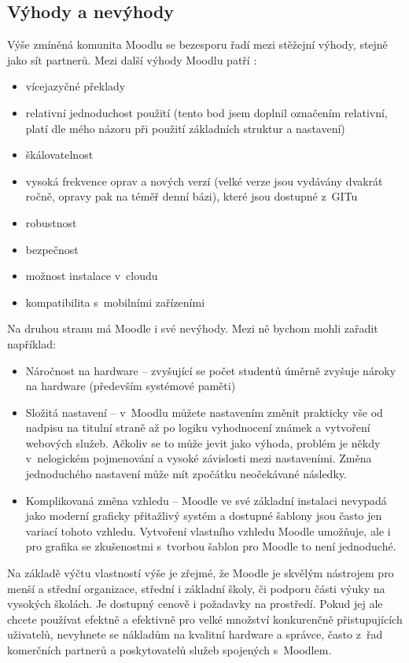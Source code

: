 \documentclass[
print,
  11pt,
  table,   
  nolof,    
  nolot,
  oneside,final
]{fithesis3}
\begin{document}
		\subsection{Výhody a nevýhody}
Výše zmíněná komunita Moodlu se bezesporu řadí mezi stěžejní výhody, stejně jako sít partnerů. Mezi další výhody Moodlu patří \cite{cooch}:
\begin{itemize}
\item vícejazyčné překlady
\item relativní jednoduchost použití (tento bod jsem doplnil označením relativní, platí dle mého názoru při použití základních struktur a nastavení)
\item škálovatelnost
\item vysoká frekvence oprav a nových verzí (velké verze jsou vydávány dvakrát ročně, opravy pak na téměř denní bázi), které jsou dostupné z~GITu
\item robustnost
\item bezpečnost
\item možnost instalace v~cloudu
\item kompatibilita s~mobilními zařízeními
\end{itemize}


Na druhou stranu má Moodle i své nevýhody. Mezi ně bychom mohli zařadit například:
\begin{itemize}
\item Náročnost na hardware -- zvyšující se počet studentů úměrně zvyšuje nároky na hardware (především systémové paměti)
\item Složitá nastavení -- v~Moodlu můžete nastavením změnit prakticky vše od nadpisu na titulní straně až po logiku vyhodnocení známek a vytvoření webových služeb. Ačkoliv se to může jevit jako výhoda, problém je někdy v~nelogickém pojmenování a vysoké závislosti me\-zi nastaveními. Změna jednoduchého nastavení může mít zpočátku neočekávané následky.
\item Komplikovaná změna vzhledu -- Moodle ve své základní instalaci nevypadá jako moderní graficky přitažlivý systém a dostupné šablony jsou často jen variací tohoto vzhledu. Vytvoření vlastního vzhledu Moodle umožňuje, ale i pro grafika se zkušenostmi s~tvorbou šablon pro Moodle to není jednoduché.
\end{itemize}

Na základě výčtu vlastností výše je zřejmé, že Moodle je skvělým nástrojem pro menší a střední organizace, střední i základní školy, či podporu části výuky na vysokých školách. Je dostupný cenově i požadavky na prostředí. Pokud jej ale chcete používat efektně a efektivně pro velké množství konkurenčně přistupujících uživatelů, nevyhnete se nákladům na kvalitní hardware a správce, často z~řad komerčních partnerů a poskytovatelů služeb spojených s~Moodlem. 
\end{document}
